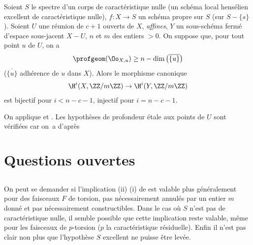 \begin{corollaire} \label{XIV.5.7} Soient $S$ le spectre d'un corps de caract\'eristique nulle (\resp un sch\'ema local hens\'elien excellent de caract\'eristique nulle), $f\colon X\to S$ un sch\'ema propre sur $S$ (\resp sur $S-\{ s\}$). Soient $U$ une r\'eunion de $c+1$ ouverts de $X$, \emph{affines}, $Y$ un sous-sch\'ema ferm\'e d'espace sous-jacent $X-U$, $n$ et $m$ des entiers $>0$. On suppose que, pour tout point $u$ de $U$, on a
$$
\profgeom(\Oo_{X, u})\geq n-\dim\big(\overline{\{ u\} }\big)$$
($\overline{\{ u\} }$ adh\'erence de $u$ dans $X$). Alors le morphisme canonique
$$
\H^{i}(X, \ZZ/m\ZZ)\to\H^{i}(Y, \ZZ/m\ZZ)$$
est bijectif pour $i<n-c-1$, injectif pour $i=n-c-1$.
\end{corollaire}

On applique  et . Les hypoth\`eses de profondeur \'etale aux points de $U$ sont v\'erifi\'ees car on~a d'apr\`es  
\enlargethispage{\baselineskip}%
\section{Questions ouvertes} \label{XIV.6}

\subsection{} \label{XIV.6.1} On peut se demander si l'implication \textup{(ii)} \ALORS \textup{(i)} de  est valable plus g\'en\'eralement pour des faisceaux $F$ de torsion, pas n\'ecessairement annul\'es par un entier $m$ donn\'e et pas n\'ecessairement constructibles\pageoriginale. Dans le cas o\`u $S$ n'est pas de caract\'eristique nulle, il semble possible que cette implication reste valable, m\^eme pour les faisceaux de $p$-torsion ($p$ la caract\'eristique r\'esiduelle). Enfin il n'est pas clair non plus que l'hypoth\`ese $S$ excellent ne puisse \^etre lev\'ee.

